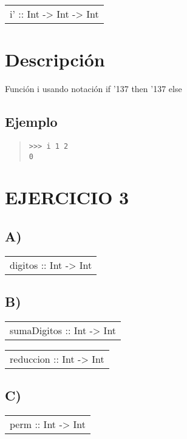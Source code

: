 \begin{haddockdesc}
\item[\begin{tabular}{@{}l}
i' :: Int -> Int -> Int
\end{tabular}]
{\haddockbegindoc
\section*{Descripción}
Función i usando notación if {\char '137} then {\char '137} else\par
\subsection*{Ejemplo}
\begin{quote}
{\haddockverb\begin{verbatim}
>>> i 1 2
0

\end{verbatim}}
\end{quote}}
\end{haddockdesc}
\section{EJERCICIO 3}
\subsection{A)}
\begin{haddockdesc}
\item[\begin{tabular}{@{}l}
digitos :: Int -> Int
\end{tabular}]
\end{haddockdesc}
\subsection{B)}
\begin{haddockdesc}
\item[\begin{tabular}{@{}l}
sumaDigitos :: Int -> Int
\end{tabular}]
\item[\begin{tabular}{@{}l}
reduccion :: Int -> Int
\end{tabular}]
\end{haddockdesc}
\subsection{C)}
\begin{haddockdesc}
\item[\begin{tabular}{@{}l}
perm :: Int -> Int
\end{tabular}]
\end{haddockdesc}
